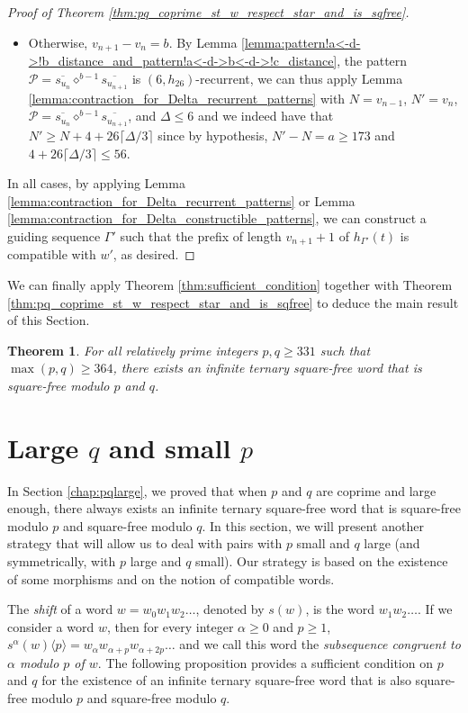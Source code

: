 \documentclass[12pt]{article}
\newtheorem{theorem}{Theorem}
\theoremstyle{definition}
\newcommand{\pattern}[3]{{#1}\diamond^{#2 - 1}{#3}}
\newcommand{\subsequence}[2]{#1\langle#2\rangle}
\begin{document}
\begin{proof}[Proof of Theorem \ref{thm:pq_coprime_st_w_respect_star_and_is_sqfree}]
\begin{itemize}
\begin{itemize}
        \item Otherwise, $v_{n + 1} - v_n = b$. By Lemma \ref{lemma:pattern!a<-d->!b_distance_and_pattern!a<-d->b<-d->!c_distance}, the pattern $\mathcal{P} = \pattern{\overline{s_{u_n}}}{b}{\overline{s_{u_{n + 1}}}}$ is $(6, h_{26})$-recurrent, we can thus apply Lemma \ref{lemma:contraction_for_Delta_recurrent_patterns} with $N = v_{n - 1}$, $N' = v_n$, $\mathcal{P} = \pattern{\overline{s_{u_n}}}{b}{\overline{s_{u_{n + 1}}}}$, and $\Delta \le 6$ and we indeed have that $N' \ge N + 4 + 26\lceil\Delta/3\rceil$ since by hypothesis,  $N' - N = a \ge 173$ and $4 + 26\lceil\Delta/3\rceil \le 56$.
    \end{itemize}
\end{itemize}

In all cases, by applying Lemma \ref{lemma:contraction_for_Delta_recurrent_patterns} or Lemma \ref{lemma:contraction_for_Delta_constructible_patterns}, we can construct a guiding sequence $\Gamma'$ such that the prefix of length $v_{n + 1} + 1$ of $h_{\Gamma'}(t)$ is compatible with $w'$, as desired.
\end{proof}

We can finally apply Theorem \ref{thm:sufficient_condition} together with Theorem \ref{thm:pq_coprime_st_w_respect_star_and_is_sqfree} to deduce the main result of this Section.
\begin{theorem}\label{thm:pq_large}
    For all relatively prime integers $p, q \ge 331$ such that $\max(p, q) \ge 364$, there exists an infinite ternary square-free word that is square-free modulo $p$ and $q$.
\end{theorem}

\section{Large $q$ and small $p$}\label{chap:smallplargeq}

In Section \ref{chap:pqlarge}, we proved that when $p$ and $q$ are coprime and large enough, there always exists an infinite ternary square-free word that is square-free modulo $p$ and square-free modulo $q$. In this section, we will present another strategy that will allow us to deal with pairs with $p$ small and $q$ large (and symmetrically, with $p$ large and $q$ small). Our strategy is based on the existence of some morphisms and on the notion of compatible words.


The \emph{shift} of a word $w = w_0w_1w_2\dots$, denoted by $s(w)$, is the word $w_1w_2\dots$. If we consider a word $w$, then for every integer $\alpha \ge 0$ and $p \ge 1$, $\subsequence{s^\alpha(w)}{p} = w_\alpha w_{\alpha + p}w_{\alpha + 2p}\dots$ and we call this word the \emph{subsequence congruent to $\alpha$ modulo $p$ of $w$}.
The following proposition provides a sufficient condition on $p$ and $q$ for the existence of an infinite ternary square-free word that is also square-free modulo $p$ and square-free modulo $q$.
\end{document}
